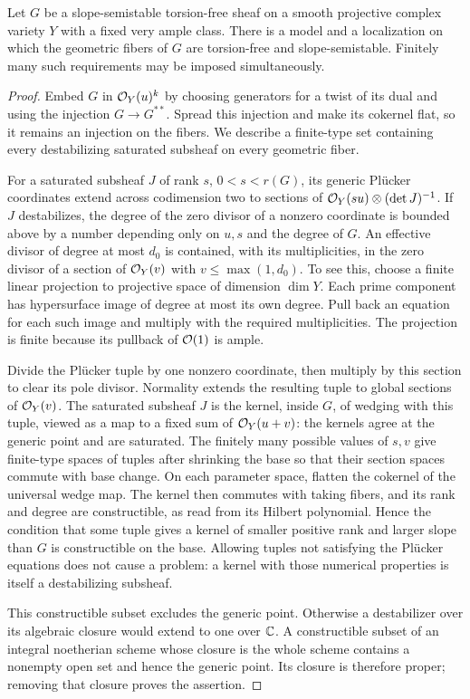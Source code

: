 \begin{lemma}\label{lem:fixed-sheaf-spreading}
Let $G$ be a slope-semistable torsion-free sheaf on a smooth
projective complex variety $Y$ with a fixed very ample class.
There is a model and a localization on which the geometric fibers
of $G$ are torsion-free and slope-semistable.  Finitely many such
requirements may be imposed simultaneously.
\end{lemma}

\begin{proof}
Embed $G$ in $\mathcal O_Y(u)^k$ by choosing generators for a twist of
its dual and using the injection $G\to G^{**}$.  Spread this
injection and make its cokernel flat, so it remains an injection
on the fibers.  We describe a finite-type set containing every
destabilizing saturated subsheaf on every geometric fiber.

For a saturated subsheaf $J$ of rank $s$, $0<s<r(G)$, its generic
Pl\"ucker coordinates extend across codimension two to sections
of $\mathcal O_Y(su)\otimes(\det J)^{-1}$.  If $J$ destabilizes, the
degree of the zero divisor of a nonzero coordinate is bounded
above by a number depending only on $u,s$ and the degree of $G$.
An effective divisor of degree at most $d_0$ is contained, with
its multiplicities, in the zero divisor of a section of
$\mathcal O_Y(v)$ with $v\leq\max(1,d_0)$.  To see this, choose a finite
linear projection to projective space of dimension $\dim Y$.
Each prime component has hypersurface image of degree at most
its own degree.  Pull back an equation for each such image and
multiply with the required multiplicities.  The projection is
finite because its pullback of $\mathcal O(1)$ is ample.

Divide the Pl\"ucker tuple by one nonzero coordinate, then multiply
by this section to clear its pole divisor.  Normality extends the
resulting tuple to global sections of $\mathcal O_Y(v)$.  The saturated
subsheaf $J$ is the kernel, inside $G$, of wedging with this tuple,
viewed as a map to a fixed sum of $\mathcal O_Y(u+v)$: the kernels agree
at the generic point and are saturated.  The finitely many possible
values of $s,v$ give finite-type spaces of tuples after shrinking
the base so that their section spaces commute with base change.
On each parameter space, flatten the cokernel of the universal
wedge map.  The kernel then commutes with taking fibers, and its
rank and degree are constructible, as read from its Hilbert
polynomial.  Hence the condition that some tuple gives a kernel
of smaller positive rank and larger slope than $G$ is constructible
on the base.  Allowing tuples not satisfying the Pl\"ucker equations
does not cause a problem: a kernel with those numerical properties
is itself a destabilizing subsheaf.

This constructible subset excludes the generic point.  Otherwise
a destabilizer over its algebraic closure would extend to one
over $\mathbb C$.  A constructible subset of an integral noetherian
scheme whose closure is the whole scheme contains a nonempty
open set and hence the generic point.  Its closure is therefore
proper; removing that closure proves the assertion.
\end{proof}

